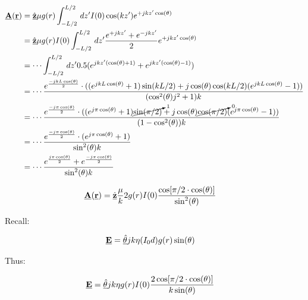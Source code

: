 \documentclass[12pt, letterpaper]{article}
\begin{document}
\begin{itemize}
  \begin{align*}
    \underline{\vb{A}}(\underline{\vb{r}})
    &=
    \underline{\hat{\vb{z}}}\mu
    g(r)
    \int_{-L/2}^{L/2}
    \,dz'I(0)\cos(kz')
    e^{+jkz'\cos(\theta)}
    \\
    &=
    \underline{\hat{\vb{z}}}\mu
    g(r)
    I(0)
    \int_{-L/2}^{L/2}
    \,dz'
    {
      e^{+jkz'}
      +
      e^{-jkz'}
      \over
      2
    }
    e^{+jkz'\cos(\theta)}
    \\
    &=
    \cdots
    \int_{-L/2}^{L/2}
    \,dz'
    0.5(e^{jkz'(\cos(\theta)+1)}
    +
    e^{jkz'(\cos(\theta)-1)}
    )
    \\
    &=
    \cdots
    {
      e^{-jkL\cos(\theta)\over2}
      \cdot
      (
        (e^{jkL\cos(\theta)}+1)\sin(kL/2)
        +
        j\cos(\theta)\cos(kL/2)(e^{jkL\cos(\theta)}-1)
      )
      \over
      (\cos[2](\theta)j^2+1)k
    }
    \\
    &=
    \cdots
    {
      e^{-j\pi\cos(\theta)\over2}
      \cdot
      (
        (e^{j\pi\cos(\theta)}+1)\cancelto{1}{\sin(\pi/2)}
        +
        j\cos(\theta)\cancelto{0}{\cos(\pi/2)}(e^{j\pi\cos(\theta)}-1)
      )
      \over
      (1-\cos[2](\theta))k
    }
    \\
    &=
    \cdots
    {
      e^{-j\pi\cos(\theta)\over2}
      \cdot
      (e^{j\pi\cos(\theta)}+1)
      \over
      \sin[2](\theta)k
    }
    \\
    &=
    \cdots
    {
      e^{j\pi\cos(\theta)\over2}
      +
      e^{-j\pi\cos(\theta)\over2}
      \over
      \sin[2](\theta)k
    }
    \\
\end{align*}

\begin{align*}
  \underline{\vb{A}}(\underline{\vb{r}})
  &=
  \underline{\hat{\vb{z}}}
  {
    \mu
    \over
    k
  }
  2
  g(r)I(0)
  {
    \cos[\pi/2\cdot\cos(\theta)]
    \over
    \sin[2](\theta)
    }
\end{align*}

  Recall:

  \begin{align*}
    \underline{\vb{E}}
    &=
    \underline{\hat{\vb{\theta}}}
    jk\eta
    (I_0d)g(r)\sin(\theta)
  \end{align*}

  Thus:

  \begin{align*}
    \underline{\vb{E}}
    &=
    \underline{\hat{\vb{\theta}}}
    jk\eta
    g(r)I(0)
    {
      2
      \cos[\pi/2\cdot\cos(\theta)]
      \over
      k\sin(\theta)
    }
  \end{align*}


\end{itemize}
\end{document}
